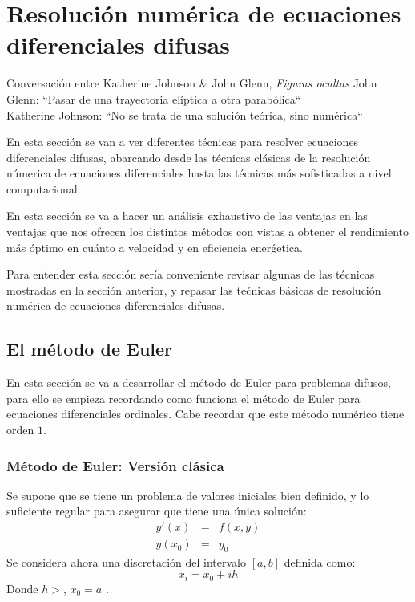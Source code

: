 \chapter{Resolución numérica de ecuaciones diferenciales difusas}
\begin{chapquote}{Conversación entre Katherine Johnson \& John Glenn, \textit{Figuras ocultas}}
	John Glenn: ``Pasar de una trayectoria elíptica a otra parabólica`` \\
	Katherine Johnson: ``No se trata de una solución teórica, sino numérica`` \cite{eulernasa}
\end{chapquote}

En esta sección se van a ver diferentes técnicas para resolver ecuaciones diferenciales difusas, abarcando desde las técnicas clásicas de la resolución númerica de ecuaciones diferenciales hasta las técnicas más sofisticadas a nivel computacional.

En esta sección se va a hacer un análisis exhaustivo de las ventajas en las ventajas que nos ofrecen los distintos métodos con vistas a obtener el rendimiento más óptimo en cuánto a velocidad y en eficiencia enerǵetica.

Para entender esta sección sería conveniente revisar algunas de las técnicas mostradas en la sección anterior, y repasar las tećnicas básicas de resolución numérica de ecuaciones diferenciales difusas.

\section{El método de Euler}
En esta sección se va a desarrollar el método de Euler para problemas difusos, para ello se empieza recordando como funciona el método de Euler para ecuaciones diferenciales ordinales. Cabe recordar que este método numérico tiene orden $1$.

\subsection{Método de Euler: Versión clásica}
Se supone que se tiene un problema de valores iniciales bien definido, y lo suficiente regular para asegurar que tiene una única solución:
\[
\begin{array}{ccc}
	y'(x) & = &f(x, y)  \\
	y(x_0) & = & y_0
\end{array}
\]
Se considera ahora una discretación del intervalo $[a, b]$ definida como:
\[
	x_i = x_0 + i h
\]
Donde $h>$, $x_0=a$ .

